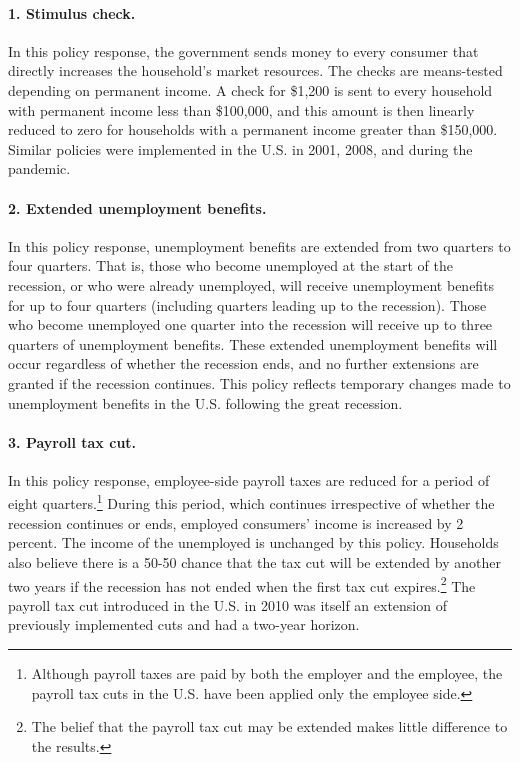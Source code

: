 \documentclass[\latexroot/\projectname]{subfiles}
\begin{document}
\paragraph{1.
  Stimulus check.} In this policy response, the government sends money to every consumer that directly increases the household's market resources.
The checks are means-tested depending on permanent income.
A check for \$1,200 is sent to every household with permanent income less than \$100,000, and this amount is then linearly reduced to zero for households with a permanent income greater than \$150,000.
Similar policies were implemented in the U.S.
in 2001, 2008, and during the pandemic.

\paragraph{2.
  Extended unemployment benefits.} In this policy response, unemployment benefits are extended from two quarters to four quarters.
That is, those who become unemployed at the start of the recession, or who were already unemployed, will receive unemployment benefits for up to four quarters (including quarters leading up to the recession).
Those who become unemployed one quarter into the recession will receive up to three quarters of unemployment benefits.
These extended unemployment benefits will occur regardless of whether the recession ends, and no further extensions are granted if the recession continues.
This policy reflects temporary changes made to unemployment benefits in the U.S.
following the great recession.

\paragraph{3.
  Payroll tax cut.} In this policy response, employee-side payroll taxes are reduced for a period of eight quarters.\footnote{Although payroll taxes are paid by both the employer and the employee, the payroll tax cuts in the U.S.
  have been applied only the employee side.} During this period, which continues irrespective of whether the recession continues or ends, employed consumers' income is increased by 2 percent.
The income of the unemployed is unchanged by this policy.
Households also believe there is a 50-50 chance that the tax cut will be extended by another two years if the recession has not ended when the first tax cut expires.\footnote{The belief that the payroll tax cut may be extended makes little difference to the results.} The payroll tax cut introduced in the U.S.
in 2010 was itself an extension of previously implemented cuts and had a two-year horizon.
\end{document}
